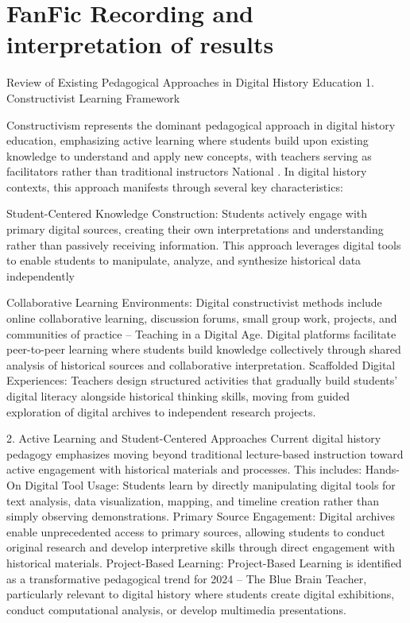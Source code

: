 \section{FanFic Recording and interpretation of results}

Review of Existing Pedagogical Approaches in Digital History Education
1. Constructivist Learning Framework

Constructivism represents the dominant pedagogical approach in digital history education, emphasizing active learning where students build upon existing knowledge to understand and apply new concepts, with teachers serving as facilitators rather than traditional instructors National \cite{Constructivism, wht_cnstrctv} . In digital history contexts, this approach manifests through several key characteristics:

Student-Centered Knowledge Construction: Students actively engage with primary digital sources, creating their own interpretations and understanding rather than passively receiving information. This approach leverages digital tools to enable students to manipulate, analyze, and synthesize historical data independently

Collaborative Learning Environments: Digital constructivist methods include online collaborative learning, discussion forums, small group work, projects, and communities of practice \cite{cnstrc2} – Teaching in a Digital Age. Digital platforms facilitate peer-to-peer learning where students build knowledge collectively through shared analysis of historical sources and collaborative interpretation.
Scaffolded Digital Experiences: Teachers design structured activities that gradually build students' digital literacy alongside historical thinking skills, moving from guided exploration of digital archives to independent research projects.

2. Active Learning and Student-Centered Approaches
Current digital history pedagogy emphasizes moving beyond traditional lecture-based instruction toward active engagement with historical materials and processes. This includes:
Hands-On Digital Tool Usage: Students learn by directly manipulating digital tools for text analysis, data visualization, mapping, and timeline creation rather than simply observing demonstrations.
Primary Source Engagement: Digital archives enable unprecedented access to primary sources, allowing students to conduct original research and develop interpretive skills through direct engagement with historical materials.
Project-Based Learning: Project-Based Learning is identified as a transformative pedagogical trend for 2024 \cite{trnds_ped} – The Blue Brain Teacher, particularly relevant to digital history where students create digital exhibitions, conduct computational analysis, or develop multimedia presentations.

